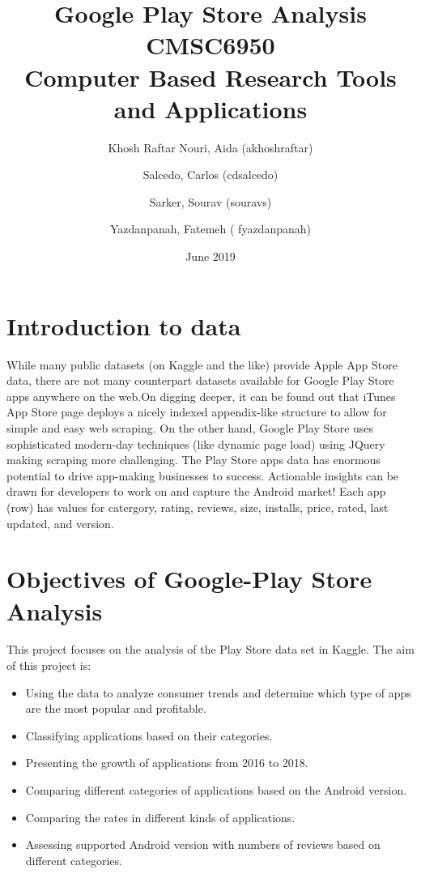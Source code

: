 \documentclass{article}
\title{
Google Play Store Analysis\\
CMSC6950 \\
Computer Based Research Tools and Applications
}
\author{Khosh Raftar Nouri, Aida  (akhoshraftar)\and
Salcedo, Carlos (cdsalcedo) \and
Sarker, Sourav (souravs)\and
Yazdanpanah, Fatemeh ( fyazdanpanah)} \date{June 2019}
\begin{document}
\maketitle

\section*{Introduction to data}

While many public datasets (on Kaggle and the like) provide Apple App Store data, there are not many counterpart datasets available for Google Play Store apps anywhere on the web.On digging deeper, it can be found out that iTunes App Store page deploys a nicely indexed appendix-like structure to allow for simple and easy web scraping. On the other hand, Google Play Store uses sophisticated modern-day techniques (like dynamic page load) using JQuery making scraping more challenging.
The Play Store apps data has enormous potential to drive app-making businesses to success. Actionable insights can be drawn for developers to work on and capture the Android market!
Each app (row) has values for catergory, rating, reviews, size, installs, price, rated, last updated, and version.


\section*{Objectives of Google-Play Store Analysis}
This project focuses on the analysis of the Play Store data set in Kaggle.
The aim of this project is:
\begin{itemize}
\item Using the data to analyze consumer trends and determine which type of apps are the most popular and profitable.\\
\item Classifying applications based on their categories.\\
\item Presenting the growth of applications from 2016 to 2018.\\
\item Comparing different categories of applications based on the Android version.\\
\item Comparing the rates in different kinds of applications.\\
\item Assessing supported Android version with numbers of reviews based on different categories.\\
\end{itemize}
\end{document}
